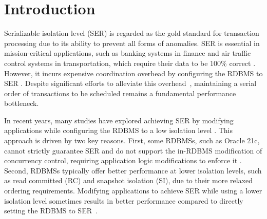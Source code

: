 \section{Introduction}
Serializable isolation level (SER) is regarded as the gold standard for transaction processing due to its ability to prevent all forms of anomalies.
SER is essential in mission-critical applications, such as banking systems in finance and air traffic control systems in transportation, which require their data to be 100\% correct \cite{DBLP:journals/pvldb/ChenPLYHTLCZD24_TDSQL}.
However, it incurs expensive coordination overhead by configuring the RDBMS to SER \cite{DBLP:journals/pvldb/VandevoortK0N21}.
Despite significant efforts to alleviate this overhead~\cite {DBLP:conf/icde/LometFWW12,DBLP:conf/sosp/TuZKLM13,DBLP:conf/sigmod/YuPSD16}, maintaining a serial order of transactions to be scheduled remains a fundamental performance bottleneck.


In recent years, many studies have explored achieving SER by modifying applications while configuring the RDBMS to a low isolation level \cite{DBLP:journals/tods/KetsmanKNV22}. This approach is driven by two key reasons. First, some RDBMSs, such as Oracle 21c, cannot strictly guarantee SER and do not support the in-RDBMS modification of concurrency control, requiring application logic modifications to enforce it \cite{DBLP:journals/pvldb/BailisDFGHS13}.
Second, RDBMSs typically offer better performance at lower isolation levels, such as read committed (RC) and snapshot isolation (SI), due to their more relaxed ordering requirements. Modifying applications to achieve SER while using a lower isolation level sometimes results in better performance compared to directly setting the RDBMS to SER~\cite{DBLP:conf/aiccsa/AlomariF15, DBLP:conf/icde/AlomariCFR08, DBLP:journals/pvldb/VandevoortK0N21}.

